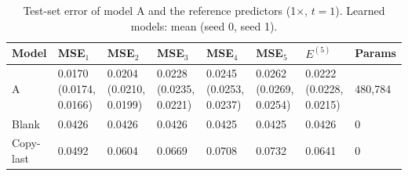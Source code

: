 \begin{table}[H]
\centering\small
\begin{tabular}{llllllll}
\toprule
Model & MSE$_1$ & MSE$_2$ & MSE$_3$ & MSE$_4$ & MSE$_5$ & $E^{(5)}$ & Params \\
\midrule
A & 0.0170 (0.0174, 0.0166) & 0.0204 (0.0210, 0.0199) & 0.0228 (0.0235, 0.0221) & 0.0245 (0.0253, 0.0237) & 0.0262 (0.0269, 0.0254) & 0.0222 (0.0228, 0.0215) & 480,784 \\
Blank & 0.0426 & 0.0426 & 0.0426 & 0.0425 & 0.0425 & 0.0426 & 0 \\
Copy-last & 0.0492 & 0.0604 & 0.0669 & 0.0708 & 0.0732 & 0.0641 & 0 \\
\bottomrule
\end{tabular}
\caption{Test-set error of model A and the reference predictors (1$\times$, $t=1$). Learned models: mean (seed 0, seed 1).}
\label{tab:q2-2}
\end{table}